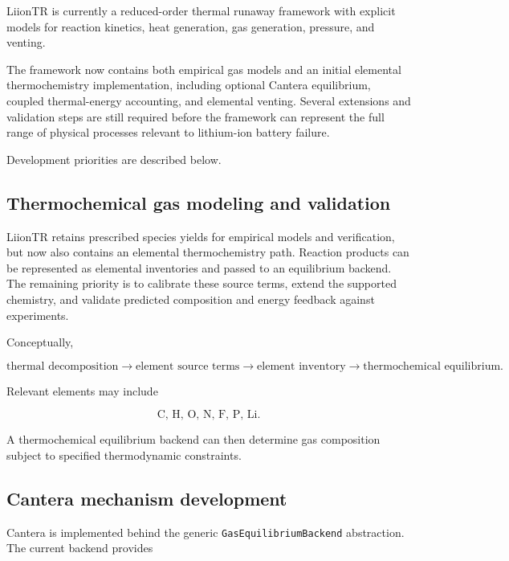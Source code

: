 LiionTR is currently a reduced-order thermal runaway framework with
explicit models for reaction kinetics, heat generation, gas generation,
pressure, and venting.

The framework now contains both empirical gas models and an initial elemental
thermochemistry implementation, including optional Cantera equilibrium,
coupled thermal-energy accounting, and elemental venting. Several extensions
and validation steps are still required before the framework can represent the
full range of physical processes relevant to lithium-ion battery failure.

Development priorities are described below.


\subsection{Thermochemical gas modeling and validation}

LiionTR retains prescribed species yields for empirical models and
verification, but now also contains an elemental thermochemistry path.
Reaction products can be represented as elemental inventories and passed to an
equilibrium backend. The remaining priority is to calibrate these source terms,
extend the supported chemistry, and validate predicted composition and energy
feedback against experiments.

Conceptually,

\begin{equation}
    \text{thermal decomposition}
    \rightarrow
    \text{element source terms}
    \rightarrow
    \text{element inventory}
    \rightarrow
    \text{thermochemical equilibrium}.
\end{equation}

Relevant elements may include

\begin{equation}
    \mathrm{
        C,\,
        H,\,
        O,\,
        N,\,
        F,\,
        P,\,
        Li
    }.
\end{equation}

A thermochemical equilibrium backend can then determine gas composition
subject to specified thermodynamic constraints.


\subsection{Cantera mechanism development}

Cantera is implemented behind the generic
\texttt{GasEquilibriumBackend} abstraction. The current backend provides

